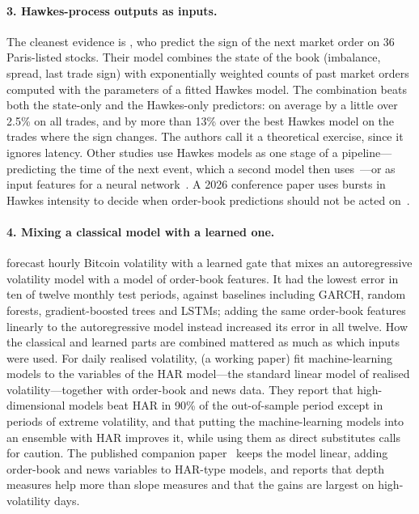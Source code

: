 \paragraph{3. Hawkes-process outputs as inputs.} The cleanest evidence is \citet{munitoke2020ratio}, who
predict the sign of the next market order on 36 Paris-listed stocks. Their model combines the state of the
book (imbalance, spread, last trade sign) with exponentially weighted counts of past market orders computed
with the parameters of a fitted Hawkes model. The combination beats both the state-only and the Hawkes-only
predictors: on average by a little over 2.5\% on all trades, and by more than 13\% over the best Hawkes
model on the trades where the sign changes. The authors call it a theoretical exercise, since it
ignores latency. Other studies use Hawkes models as one stage of a pipeline---predicting the time of the
next event, which a second model then uses~\citep{cestari2025hawkes,raffaelli2026mhp}---or as input
features for a neural network~\citep{fabre2025spoof}. A 2026 conference paper uses bursts in Hawkes intensity to decide when
order-book predictions should not be acted on~\citep{yadav2026hawkes}.

\paragraph{4. Mixing a classical model with a learned one.} \citet{guo2018btcvol} forecast hourly Bitcoin
volatility with a learned gate that mixes an autoregressive volatility model with a model of order-book
features. It had the lowest error in ten of twelve monthly test periods, against baselines including GARCH,
random forests, gradient-boosted trees and LSTMs; adding the same order-book features linearly to the
autoregressive model instead increased its error in all twelve. How the classical and learned parts are combined
mattered as much as which inputs were used. For daily realised volatility, \citet{rahimikia2020ml} (a working paper) fit machine-learning
models to the variables of the HAR model---the standard linear model of realised volatility---together with
order-book and news data. They report that high-dimensional models beat HAR in 90\% of the out-of-sample period
except in periods of extreme volatility, and that putting the machine-learning models into an ensemble with HAR
improves it, while using them as direct substitutes calls for caution. The published companion
paper~\citep{rahimikia2026altdata} keeps the model linear, adding order-book and news variables to HAR-type
models, and reports that depth measures help more than slope measures and that the gains are largest on
high-volatility days.


